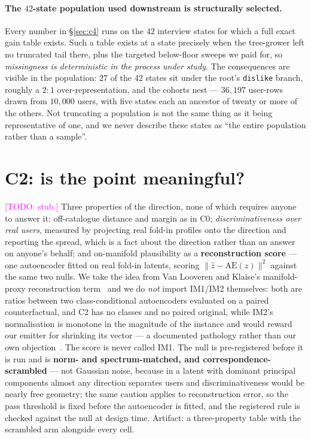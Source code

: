 \documentclass[11pt]{article}
\newcommand{\todo}[1]{\textcolor{magenta}{[TODO: #1]}}
\begin{document}
\paragraph{The $42$-state population used downstream is structurally selected.} Every number in
\S\ref{sec:c4} runs on the $42$ interview states for which a full exact gain table exists. Such a
table exists at a state precisely when the tree-grower left no truncated tail there, plus the
targeted below-floor sweeps we paid for, so \emph{missingness is deterministic in the process under
study}. The consequences are visible in the population: $27$ of the $42$ states sit under the root's
\texttt{dislike} branch, roughly a $2{:}1$ over-representation, and the cohorts nest --- $36{,}197$
user-rows drawn from $10{,}000$ users, with five states each an ancestor of twenty or more of the
others. Not truncating a population is not the same thing as it being representative of one, and we
never describe these states as ``the entire population rather than a sample''.


\section{C2: is the point meaningful?}
\label{sec:c2}

\todo{stub.} Three properties of the direction, none of which requires anyone to answer it:
off-catalogue distance and margin as in C0; \emph{discriminativeness over real users}, measured by
projecting real fold-in profiles onto the direction and reporting the spread, which is a fact about
the direction rather than an answer on anyone's behalf; and on-manifold plausibility as a
\textbf{reconstruction score} --- one autoencoder fitted on real fold-in latents, scoring
$\lVert \hat{z} - \mathrm{AE}(\hat{z})\rVert^2$ against the same two nulls. We take the idea from Van
Looveren and Klaise's manifold-proxy reconstruction term~\cite{vanlooveren2019prototypes} and we do
\emph{not} import IM1/IM2 themselves: both are ratios between two class-conditional autoencoders
evaluated on a paired counterfactual, and C2 has no classes and no paired original, while IM2's
normalisation is monotone in the magnitude of the instance and would reward our emitter for shrinking
its vector --- a documented pathology rather than our own objection~\cite{hvilshoj2021cfeval}. The
score is never called IM1. The null is pre-registered before it is run and is \textbf{norm- and
spectrum-matched, and correspondence-scrambled} --- not Gaussian noise, because in a latent with
dominant principal components almost any direction separates users and discriminativeness would be
nearly free geometry; the same caution applies to reconstruction error, so the pass threshold is
fixed before the autoencoder is fitted, and the registered rule is checked against the null at design
time. Artifact: a three-property table with the scrambled arm alongside every cell.
\end{document}
